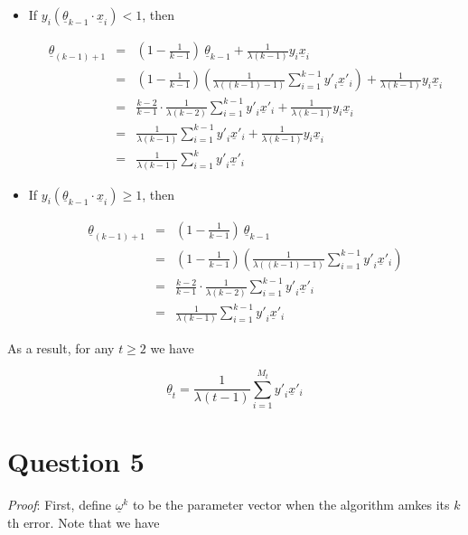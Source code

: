 \documentclass[12pt]{article}
\begin{document}
\begin{itemize}
\item If $y_i(\underline {\theta}_{k-1} \cdot \underline {x}_i) < 1$, then

\begin{eqnarray*}
\underline {\theta}_{(k-1)+1} & = & (1 - \frac {1}{k-1}) \: \underline
{\theta}_{k-1} + \frac {1}{\lambda (k-1)} y_i \underline {x}_i \\
& = & (1 - \frac {1}{k-1}) (\frac {1}{\lambda ((k-1)-1)}
\sum_{i=1}^{k-1} {{y'}_i \underline {x}'_i}) 
 + \frac {1}{\lambda (k-1)} y_i \underline {x}_i \\
& = & \frac {k-2}{k-1} \cdot \frac {1}{\lambda (k-2)} \sum_{i=1}^{k-1}
{{y'}_i \underline {x}'_i} + \frac {1}{\lambda 
  (k-1)} y_i \underline {x}_i \\
& = & \frac {1}{\lambda (k-1)} \sum_{i=1}^{k-1} {{y'}_i \underline
  {x}'_i} + \frac {1}{\lambda (k-1)} y_i \underline {x}_i \\
& = & \frac {1}{\lambda (k-1)} \sum_{i=1}^{k} {{y'}_i \underline
  {x}'_i}
\end{eqnarray*}

\item If $y_i(\underline {\theta}_{k-1} \cdot \underline {x}_i) \ge
  1$, then

\begin{eqnarray*}
\underline {\theta}_{(k-1)+1} & = & (1 - \frac {1}{k-1}) \: \underline
{\theta}_{k-1} \\
& = & (1 - \frac {1}{k-1}) (\frac {1}{\lambda ((k-1)-1)}
\sum_{i=1}^{k-1} {{y'}_i \underline {x}'_i}) \\
& = & \frac {k-2}{k-1} \cdot \frac {1}{\lambda (k-2)}
\sum_{i=1}^{k-1} {{y'}_i \underline {x}'_i} \\
& = & \frac {1}{\lambda (k-1)} \sum_{i=1}^{k-1} {{y'}_i \underline
  {x}'_i}
\end{eqnarray*}
\end{itemize}

As a result, for any $t \ge 2$ we have

\begin{equation*}
  \underline {\theta}_{t} = \frac {1}{\lambda (t-1)} \sum_{i=1}^{M_t}
  {{y'}_i \underline {x}'_i}
\end{equation*}

\section*{Question 5}

\textit {Proof}: First, define $\underline {\omega}^k$ to be the
parameter vector when the algorithm amkes its $k$th error. Note that
we have
\end{document}
